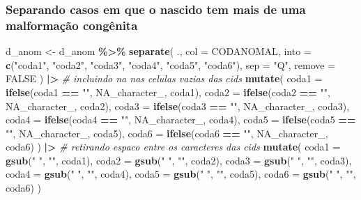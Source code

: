 \documentclass[
]{article}
\newenvironment{Shaded}{\begin{snugshade}}{\end{snugshade}}
\newcommand{\AttributeTok}[1]{\textcolor[rgb]{0.13,0.29,0.53}{#1}}
\newcommand{\CommentTok}[1]{\textcolor[rgb]{0.56,0.35,0.01}{\textit{#1}}}
\newcommand{\ConstantTok}[1]{\textcolor[rgb]{0.56,0.35,0.01}{#1}}
\newcommand{\FunctionTok}[1]{\textcolor[rgb]{0.13,0.29,0.53}{\textbf{#1}}}
\newcommand{\NormalTok}[1]{#1}
\newcommand{\OtherTok}[1]{\textcolor[rgb]{0.56,0.35,0.01}{#1}}
\newcommand{\SpecialCharTok}[1]{\textcolor[rgb]{0.81,0.36,0.00}{\textbf{#1}}}
\newcommand{\StringTok}[1]{\textcolor[rgb]{0.31,0.60,0.02}{#1}}
\begin{document}
\hypertarget{separando-casos-em-que-o-nascido-tem-mais-de-uma-malformauxe7uxe3o-conguxeanita}{%
\subsubsection{Separando casos em que o nascido tem mais de uma
malformação
congênita}\label{separando-casos-em-que-o-nascido-tem-mais-de-uma-malformauxe7uxe3o-conguxeanita}}

\begin{Shaded}
\begin{Highlighting}[]
\NormalTok{d\_anom }\OtherTok{\textless{}{-}}\NormalTok{ d\_anom }\SpecialCharTok{\%\textgreater{}\%}
  \FunctionTok{separate}\NormalTok{(}
\NormalTok{    ., }\AttributeTok{col =}\NormalTok{ CODANOMAL, }
    \AttributeTok{into =} \FunctionTok{c}\NormalTok{(}\StringTok{"coda1"}\NormalTok{, }\StringTok{"coda2"}\NormalTok{, }\StringTok{"coda3"}\NormalTok{, }\StringTok{"coda4"}\NormalTok{, }\StringTok{"coda5"}\NormalTok{, }\StringTok{"coda6"}\NormalTok{), }\AttributeTok{sep =} \StringTok{"Q"}\NormalTok{, }
    \AttributeTok{remove =} \ConstantTok{FALSE}
\NormalTok{  ) }\SpecialCharTok{|\textgreater{}}
  \CommentTok{\# incluindo na nas celulas vazias das cids}
  \FunctionTok{mutate}\NormalTok{(}
    \AttributeTok{coda1 =} \FunctionTok{ifelse}\NormalTok{(coda1 }\SpecialCharTok{==} \StringTok{""}\NormalTok{, }\ConstantTok{NA\_character\_}\NormalTok{, coda1),}
    \AttributeTok{coda2 =} \FunctionTok{ifelse}\NormalTok{(coda2 }\SpecialCharTok{==} \StringTok{""}\NormalTok{, }\ConstantTok{NA\_character\_}\NormalTok{, coda2),}
    \AttributeTok{coda3 =} \FunctionTok{ifelse}\NormalTok{(coda3 }\SpecialCharTok{==} \StringTok{""}\NormalTok{, }\ConstantTok{NA\_character\_}\NormalTok{, coda3),}
    \AttributeTok{coda4 =} \FunctionTok{ifelse}\NormalTok{(coda4 }\SpecialCharTok{==} \StringTok{""}\NormalTok{, }\ConstantTok{NA\_character\_}\NormalTok{, coda4),}
    \AttributeTok{coda5 =} \FunctionTok{ifelse}\NormalTok{(coda5 }\SpecialCharTok{==} \StringTok{""}\NormalTok{, }\ConstantTok{NA\_character\_}\NormalTok{, coda5),}
    \AttributeTok{coda6 =} \FunctionTok{ifelse}\NormalTok{(coda6 }\SpecialCharTok{==} \StringTok{""}\NormalTok{, }\ConstantTok{NA\_character\_}\NormalTok{, coda6)}
\NormalTok{  ) }\SpecialCharTok{|\textgreater{}} 
  \CommentTok{\# retirando espaco entre os caracteres das cids}
  \FunctionTok{mutate}\NormalTok{(}
    \AttributeTok{coda1 =} \FunctionTok{gsub}\NormalTok{(}\StringTok{" "}\NormalTok{, }\StringTok{""}\NormalTok{, coda1),}
    \AttributeTok{coda2 =} \FunctionTok{gsub}\NormalTok{(}\StringTok{" "}\NormalTok{, }\StringTok{""}\NormalTok{, coda2),}
    \AttributeTok{coda3 =} \FunctionTok{gsub}\NormalTok{(}\StringTok{" "}\NormalTok{, }\StringTok{""}\NormalTok{, coda3),}
    \AttributeTok{coda4 =} \FunctionTok{gsub}\NormalTok{(}\StringTok{" "}\NormalTok{, }\StringTok{""}\NormalTok{, coda4),}
    \AttributeTok{coda5 =} \FunctionTok{gsub}\NormalTok{(}\StringTok{" "}\NormalTok{, }\StringTok{""}\NormalTok{, coda5),}
    \AttributeTok{coda6 =} \FunctionTok{gsub}\NormalTok{(}\StringTok{" "}\NormalTok{, }\StringTok{""}\NormalTok{, coda6)}
\NormalTok{  )}
\end{Highlighting}
\end{Shaded}
\end{document}
